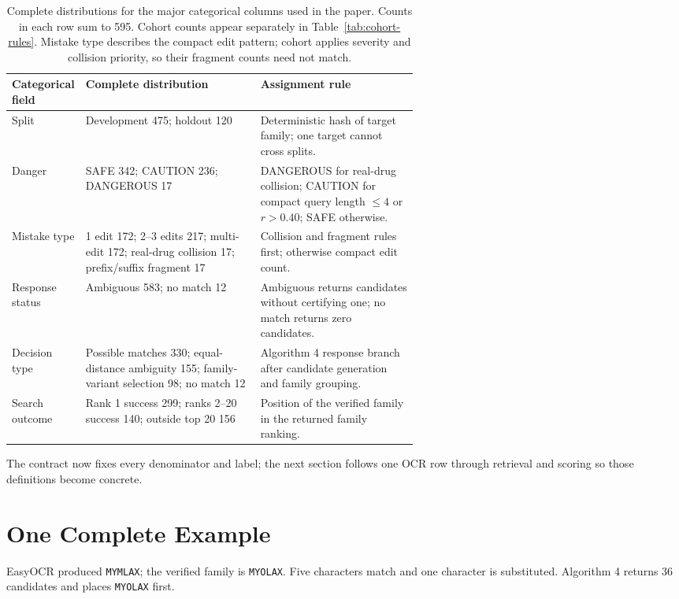 \documentclass[11pt]{article}
\newcommand{\code}[1]{\texttt{#1}}
\begin{document}
\begin{table}[htbp]
\centering
\small
\begin{tabularx}{\linewidth}{@{}p{0.17\linewidth}p{0.43\linewidth}Y@{}}
\toprule
\textbf{Categorical field} & \textbf{Complete distribution} & \textbf{Assignment rule} \\
\midrule
Split & Development 475; holdout 120 & Deterministic hash of target family; one target cannot cross splits. \\
Danger & SAFE 342; CAUTION 236; DANGEROUS 17 & DANGEROUS for real-drug collision; CAUTION for compact query length $\leq4$ or $r>0.40$; SAFE otherwise. \\
Mistake type & 1 edit 172; 2--3 edits 217; multi-edit 172; real-drug collision 17; prefix/suffix fragment 17 & Collision and fragment rules first; otherwise compact edit count. \\
Response status & Ambiguous 583; no match 12 & Ambiguous returns candidates without certifying one; no match returns zero candidates. \\
Decision type & Possible matches 330; equal-distance ambiguity 155; family-variant selection 98; no match 12 & Algorithm 4 response branch after candidate generation and family grouping. \\
Search outcome & Rank 1 success 299; ranks 2--20 success 140; outside top 20 156 & Position of the verified family in the returned family ranking. \\
\bottomrule
\end{tabularx}
\caption{Complete distributions for the major categorical columns used in the
paper. Counts in each row sum to 595. Cohort counts appear separately in
Table~\ref{tab:cohort-rules}. Mistake type describes the compact edit pattern;
cohort applies severity and collision priority, so their fragment counts need
not match.}
\label{tab:categorical-distributions}
\end{table}

\FloatBarrier
The contract now fixes every denominator and label; the next section follows one
OCR row through retrieval and scoring so those definitions become concrete.
\section{One Complete Example}

EasyOCR produced \code{MYMLAX}; the verified family is \code{MYOLAX}. Five
characters match and one character is substituted. Algorithm 4 returns 36
candidates and places \code{MYOLAX} first.
\end{document}
